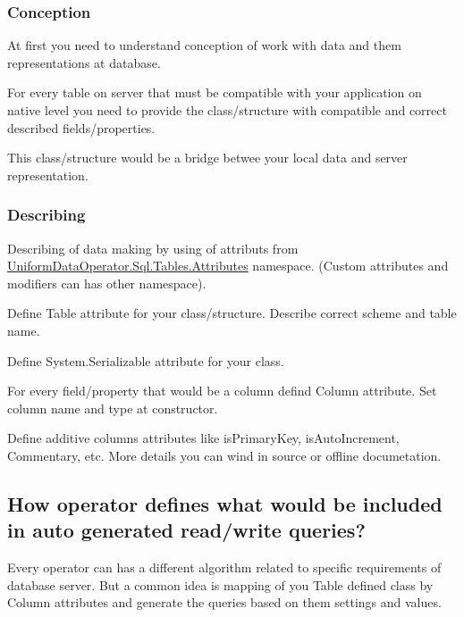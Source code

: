 \subsubsection*{Conception}

At first you need to understand conception of work with data and them representations at database.

For every table on server that must be compatible with your application on native level you need to provide the class/structure with compatible and correct described fields/properties.

This class/structure would be a bridge betwee your local data and server representation.

\subsubsection*{Describing}

Describing of data making by using of attributs from \textquotesingle{}\mbox{\hyperlink{namespace_uniform_data_operator_1_1_sql_1_1_tables_1_1_attributes}{Uniform\+Data\+Operator.\+Sql.\+Tables.\+Attributes}}\textquotesingle{} namespace. (Custom attributes and modifiers can has other namespace).


\begin{DoxyEnumerate}
\item Define \textquotesingle{}Table\textquotesingle{} attribute for your class/structure. Describe correct scheme and table name.
\item Define \textquotesingle{}System.\+Serializable\textquotesingle{} attribute for your class.
\item For every field/property that would be a column defind \textquotesingle{}Column\textquotesingle{} attribute. Set column name and type at constructor.
\item Define additive columns\textquotesingle{} attributes like \textquotesingle{}is\+Primary\+Key\textquotesingle{}, \textquotesingle{}is\+Auto\+Increment\textquotesingle{}, \textquotesingle{}Commentary\textquotesingle{}, etc. More details you can wind in source or offline documetation.
\end{DoxyEnumerate}

\subsection*{How operator defines what would be included in auto generated read/write queries?}

Every operator can has a different algorithm related to specific requirements of database server. But a common idea is mapping of you \textquotesingle{}Table\textquotesingle{} defined class by \textquotesingle{}Column\textquotesingle{} attributes and generate the queries based on them settings and values.

